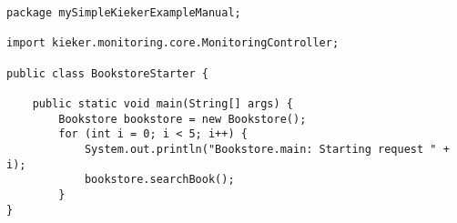 \begin{lstlisting}[caption=BookstoreMonitoringStarter.java] 
package mySimpleKiekerExampleManual;

import kieker.monitoring.core.MonitoringController;

public class BookstoreStarter {

    public static void main(String[] args) {
        Bookstore bookstore = new Bookstore();
        for (int i = 0; i < 5; i++) {
            System.out.println("Bookstore.main: Starting request " + i);
            bookstore.searchBook();
        }
}
\end{lstlisting}